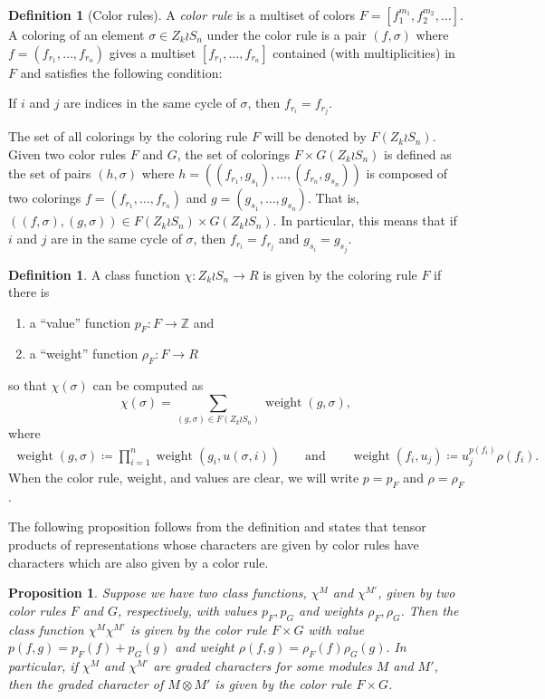 \documentclass[a4paper,12pt]{amsart}
\theoremstyle{plain}
\newtheorem{proposition}[theorem]{Proposition}
\theoremstyle{definition}
\newtheorem{definition}[theorem]{Definition}
\theoremstyle{remark}
\DeclareMathOperator{\weight}{weight}
\begin{document}
\begin{definition}[Color rules]
A {\emph{color rule}} is a multiset of colors $F= [f_1^{m_1},f_2^{m_2},\dots]$.
A coloring of an element $\sigma \in Z_k \wr S_n$ under the color rule is a pair $(f,\sigma)$ where $f = (f_{r_1},\dots,f_{r_n})$ gives a multiset $[f_{r_1},\dots,f_{r_n}]$ contained (with multiplicities) in $F$ and satisfies the
following condition:

\begin{center} 
If $i$ and $j$ are indices in the same cycle of $\sigma$, then $f_{r_i} = f_{r_j}$.
\end{center}

The set of all colorings by the coloring rule $F$ will be denoted by $F(Z_k \wr S_n)$. \\

Given two color rules $F$ and $G$,
the set of colorings $F\times G(Z_k \wr S_n)$ is defined as the set of pairs
$(h,\sigma)$ where $h= ((f_{r_1},g_{s_1}),\dots, (f_{r_n},g_{s_n}))$ is composed of two colorings $f =(f_{r_1},\dots,f_{r_n})$ and $g = (g_{s_1},\dots,g_{s_n})$. That is, $((f,\sigma),(g,\sigma)) \in F(Z_k \wr S_n) \times G(Z_k \wr S_n)$. In particular, this means that if $i$ and $j$ are in the same cycle of $\sigma$, then $f_{r_i} = f_{r_j}$ and $g_{s_i} = g_{s_j}$.
\end{definition}

\begin{definition}\label{definition:color_rule}
A class function $\chi: Z_k \wr S_n \rightarrow R$ is given by the coloring rule $F$ if there is
\begin{enumerate}
     \item a ``value'' function $p_F:F \rightarrow \mathbb{Z}$ and 
     \item a ``weight'' function $\rho_F:F \rightarrow R$
\end{enumerate}
so that
$\chi(\sigma)$ can be computed as
\[
\chi(\sigma) = \sum_{(g,\sigma) \in F(Z_k \wr S_n)}  \weight(g,\sigma),
\]
where
\begin{align*}
\weight(g,\sigma) \coloneq \prod_{i=1}^n \weight(g_i,u(\sigma,i))&& \text{ and } &&
    \weight(f_i,u_j) \coloneq u_j^{p(f_i)} \rho(f_i).
\end{align*}
When the color rule, weight, and values are clear, we will write $p = p_F$ and $\rho = \rho_F$. 
\end{definition}
The following proposition follows from the definition and states that tensor products of representations whose characters are given by color rules have characters which are also given by a color rule.
\begin{proposition} \label{proposition:products_of_colors}
Suppose we have two class functions,
$\chi^M$ and $\chi^{M'}$, given by two color rules $F$ and $G$, respectively, with values $p_F,p_G$ and weights $\rho_F,\rho_G$. Then the class function $\chi^M \chi^{M'} $ is given by the color rule
$F \times G$ with value $p(f,g) = p_F(f)+ p_G(g)$ and weight $\rho(f,g)= \rho_F(f)\rho_G(g).$
In particular, if $\chi^M$ and $\chi^{M'}$ are graded characters for some modules $M$ and $M'$, then the graded character of $M \otimes M'$ is given by the color rule $F \times G$.
\end{proposition}
\end{document}
